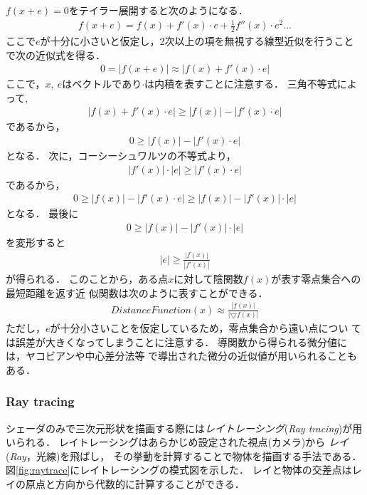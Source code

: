 $f(x + e) = 0$をテイラー展開すると次のようになる．
\begin{align*}
f(x + e) = f(x) + f'(x) \cdot e  + \frac{1}{2}f''(x) \cdot e^2 ...
\end{align*}
ここで$e$が十分に小さいと仮定し，2次以上の項を無視する線型近似を行うこと
で次の近似式を得る．
\begin{align*}
0=|f(x + e)| \approx |f(x) + f'(x) \cdot e|
\end{align*}
ここで，$x,~e$はベクトルであり$\cdot$は内積を表すことに注意する．
三角不等式によって,
\begin{align*}
| f(x) + f'(x) \cdot e| \geq |f(x)| - |f'(x) \cdot e|
\end{align*}
であるから，
\begin{align*}
0 \geq |f(x)| - |f'(x) \cdot e|
\end{align*}
となる．
次に，コーシーシュワルツの不等式より，
\begin{align*}
 |f'(x)| \cdot |e| \geq | f'(x)\cdot e|
\end{align*}
であるから，
\begin{align*}
 0 \geq |f(x)| - |f'(x) \cdot e| \geq |f(x)| - |f'(x)| \cdot |e|
\end{align*}
となる．
最後に
\begin{align*}
0 \geq |f(x)| - |f'(x)| \cdot |e|
\end{align*}
を変形すると
\begin{align*}
|e| \geq \frac{|f(x)|}{|f'(x)|}
\end{align*}
が得られる．
このことから，ある点$x$に対して陰関数$f(x)$が表す零点集合への最短距離を返す近
似関数は次のように表すことができる．
\begin{align*}
 DistanceFunction(x) \approx \frac{|f(x)|}{|\bigtriangledown f(x)|}
\end{align*}
ただし，$e$が十分小さいことを仮定しているため，零点集合から遠い点につい
ては誤差が大きくなってしまうことに注意する．
導関数から得られる微分値には，ヤコビアンや中心差分法等
で導出された微分の近似値が用いられることもある．

\subsubsection{Ray tracing}

シェーダのみで三次元形状を描画する際には\emph{レイトレーシング}({\it Ray
tracing})が用いられる．
レイトレーシングはあらかじめ設定された視点(カメラ)から
\emph{レイ}({\it Ray}，光線)を飛ばし，
その挙動を計算することで物体を描画する手法である．
図\ref{fig:raytrace}にレイトレーシングの模式図を示した．
レイと物体の交差点はレイの原点と方向から代数的に計算することができる．

